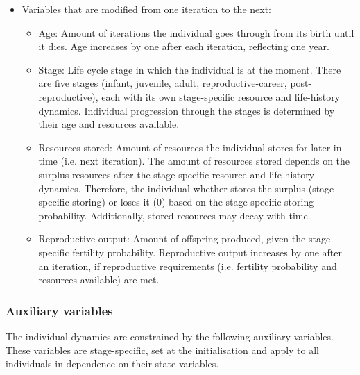 \documentclass{article}
\begin{document}
\begin{itemize}
\begin{itemize}
    \end{itemize}
    \item Variables that are modified from one iteration to the next:
    \begin{itemize}
        \item Age: Amount of iterations the individual goes through from its birth until it dies. Age increases by one after each iteration, reflecting one year.
        \item Stage: Life cycle stage in which the individual is at the moment. There are five stages (infant, juvenile, adult, reproductive-career, post-reproductive), each with its own stage-specific resource and life-history dynamics. Individual progression through the stages is determined by their age and resources available.
        \item Resources stored: Amount of resources the individual stores for later in time (i.e. next iteration). The amount of resources stored depends on the surplus resources after the stage-specific resource and life-history dynamics. Therefore, the individual whether stores the surplus (stage-specific storing) or loses it (0) based on the stage-specific storing probability. Additionally, stored resources may decay with time.
        \item Reproductive output: Amount of offspring produced, given the stage-specific fertility probability. Reproductive output increases by one after an iteration, if reproductive requirements (i.e. fertility probability and resources available) are met.
    \end{itemize}
\end{itemize}

\subsubsection{Auxiliary variables}

The individual dynamics are constrained by the following auxiliary variables. These variables are stage-specific, set at the initialisation and apply to all individuals in dependence on their state variables.
\end{document}
